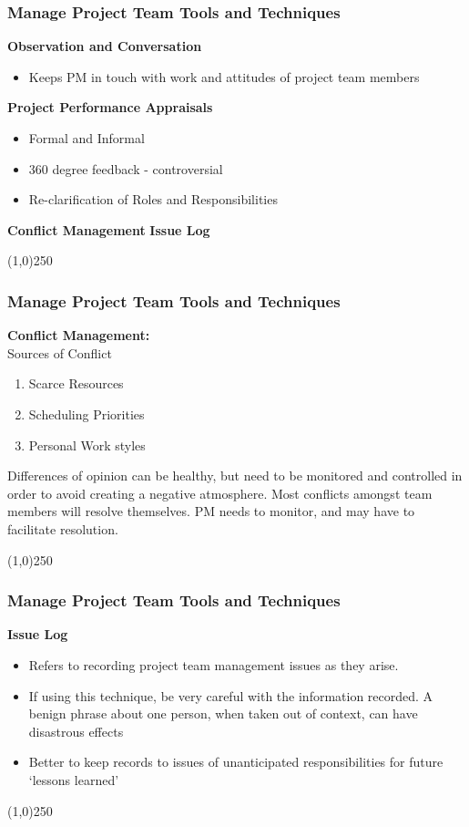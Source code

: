 \begin{frame}
\frametitle{Manage Project Team \hfill Tools and Techniques}
\textbf{Observation and Conversation}
	\begin{itemize}
		\item Keeps PM in touch with work and attitudes of project team members
	\end{itemize}
\textbf{Project Performance Appraisals}
	\begin{itemize}
		\item Formal and Informal
		\item 360 degree feedback - controversial
		\item Re-clarification of Roles and Responsibilities
	\end{itemize}
\textbf{Conflict Management}
\textbf{Issue Log}
\end{frame}\begin{center}\line(1,0){250}\end{center}


\begin{frame}
\frametitle{Manage Project Team \hfill Tools and Techniques}
\textbf{Conflict Management:}\\
Sources of Conflict
		\begin{enumerate}
			\item Scarce Resources
			\item Scheduling Priorities
			\item Personal Work styles
		\end{enumerate}
\begin{block}{}
Differences of opinion can be healthy, but need to be monitored and controlled in order to avoid creating a negative atmosphere.  Most conflicts amongst team members will resolve themselves.  PM needs to monitor, and may have to facilitate resolution.
\end{block}
\end{frame}\begin{center}\line(1,0){250}\end{center}




\begin{frame}
\frametitle{Manage Project Team \hfill Tools and Techniques}
\textbf{Issue Log}
\begin{itemize}
	\item Refers to recording project team management issues as they arise.
	\item If using this technique, be very careful with the information recorded.  A benign phrase about one person, when taken out of context, can have disastrous effects
	\item Better to keep records to issues of unanticipated responsibilities for future `lessons learned'
\end{itemize}
\end{frame}\begin{center}\line(1,0){250}\end{center}



